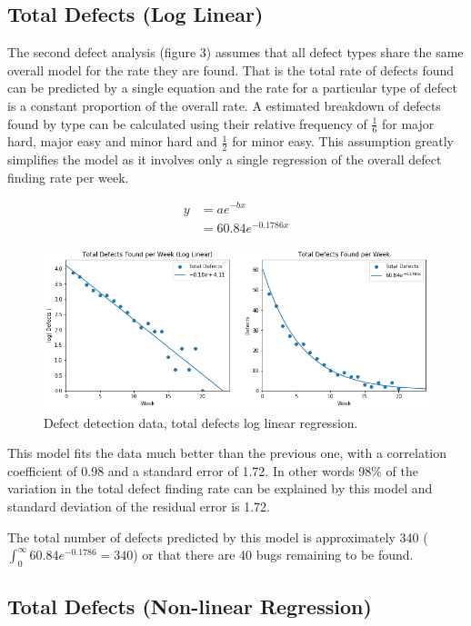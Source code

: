 \documentclass[12pt,a4paper]{article}
\begin{document}
		
	\subsection{Total Defects (Log Linear)}
		
		The second defect analysis (figure 3) assumes that all defect types share the same overall model for the rate they are found. That is the total rate of defects found can be predicted by a single equation and the rate for a particular type of defect is a constant proportion of the overall rate. A estimated breakdown of defects found by type can be calculated using their relative frequency of $\frac{1}{6}$ for major hard, major easy and minor hard and $\frac{1}{2}$ for minor easy. This assumption greatly simplifies the model as it involves only a single regression of the overall defect finding rate per week.
		
		\begin{align*}
			y &= a e ^ {-b x}\\
			&= 60.84 e ^ {-0.1786 x}
		\end{align*}
		
		\begin{figure}[hh]
			\centering
			\includegraphics[scale=0.6]{total_log_lin}
			\caption{Defect detection data, total defects log linear regression.}
		\end{figure}
	
		This model fits the data much better than the previous one, with a correlation coefficient of 0.98 and a standard error of 1.72. In other words 98\% of the variation in the total defect finding rate can be explained by this model and standard deviation of the residual error is 1.72.
		
		The total number of defects predicted by this model is approximately 340 ($\int_0^\infty 60.84 e ^ {-0.1786} = 340$) or that there are 40 bugs remaining to be found.
	
	
	\subsection{Total Defects (Non-linear Regression)}
		
\end{document}
